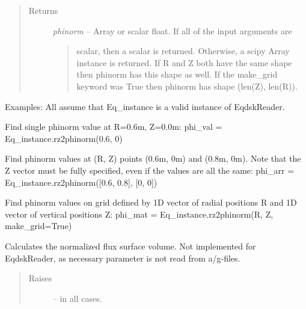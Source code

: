 \documentclass[letterpaper,10pt,english]{sphinxmanual}
\begin{document}
\begin{fulllineitems}
\begin{fulllineitems}
\begin{quote}
\begin{description}
\item[{Returns}] \leavevmode

\emph{phinorm} --
Array or scalar float. If all of the input arguments are
\begin{quote}

scalar, then a scalar is returned. Otherwise, a scipy Array
instance is returned. If R and Z both have the same shape then
phinorm has this shape as well. If the make\_grid keyword was
True then phinorm has shape (len(Z), len(R)).
\end{quote}


\end{description}\end{quote}

Examples:
All assume that Eq\_instance is a valid instance of EqdskReader.

Find single phinorm value at R=0.6m, Z=0.0m:
phi\_val = Eq\_instance.rz2phinorm(0.6, 0)

Find phinorm values at (R, Z) points (0.6m, 0m) and (0.8m, 0m).
Note that the Z vector must be fully specified,
even if the values are all the same:
phi\_arr = Eq\_instance.rz2phinorm({[}0.6, 0.8{]}, {[}0, 0{]})

Find phinorm values on grid defined by 1D vector of radial positions R
and 1D vector of vertical positions Z:
phi\_mat = Eq\_instance.rz2phinorm(R, Z, make\_grid=True)

\end{fulllineitems}


\begin{fulllineitems}
\label{eqtools:eqtools.eqdskreader.EqdskReader.rz2volnorm}
Calculates the normalized flux surface volume.
Not implemented for EqdskReader, as necessary parameter
is not read from a/g-files.
\begin{quote}\begin{description}
\item[{Raises }] \leavevmode
{} -- 
in all cases.

\end{description}\end{quote}

\end{fulllineitems}



\end{fulllineitems}
\end{document}
